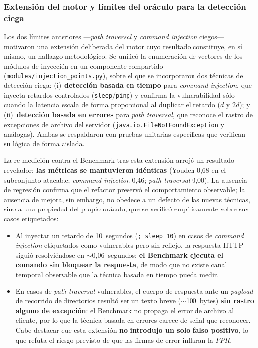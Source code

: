 \documentclass[12pt, a4paper]{article}
\begin{document}
\subsubsection{Extensión del motor y límites del oráculo para la detección ciega}

Los dos límites anteriores ---\textit{path traversal} y \textit{command injection}
ciegos--- motivaron una extensión deliberada del motor cuyo resultado constituye,
en sí mismo, un hallazgo metodológico. Se unificó la enumeración de vectores de los
módulos de inyección en un componente compartido
(\texttt{modules/injection\_points.py}), sobre el que se incorporaron dos técnicas
de detección ciega: (i)~\textbf{detección basada en tiempo} para \textit{command
injection}, que inyecta retardos controlados (\texttt{sleep}/\texttt{ping}) y
confirma la vulnerabilidad sólo cuando la latencia escala de forma proporcional al
duplicar el retardo ($d$ y $2d$); y (ii)~\textbf{detección basada en errores} para
\textit{path traversal}, que reconoce el rastro de excepciones de archivo del
servidor (\texttt{java.io.FileNotFoundException} y análogas). Ambas se respaldaron
con pruebas unitarias específicas que verifican su lógica de forma aislada.

La re-medición contra el Benchmark tras esta extensión arrojó un resultado
revelador: \textbf{las métricas se mantuvieron idénticas} (Youden 0,68 en el
subconjunto atacable; \textit{command injection} 0,46; \textit{path traversal}
0,00). La ausencia de regresión confirma que el refactor preservó el comportamiento
observable; la ausencia de mejora, sin embargo, no obedece a un defecto de las
nuevas técnicas, sino a una propiedad del propio oráculo, que se verificó
empíricamente sobre sus casos etiquetados:

\begin{itemize}
    \item Al inyectar un retardo de 10~segundos (\texttt{; sleep 10}) en casos de
    \textit{command injection} etiquetados como vulnerables pero sin reflejo, la
    respuesta HTTP siguió resolviéndose en $\sim$0,06~segundos: \textbf{el Benchmark
    ejecuta el comando sin bloquear la respuesta}, de modo que no existe canal
    temporal observable que la técnica basada en tiempo pueda medir.

    \item En casos de \textit{path traversal} vulnerables, el cuerpo de respuesta
    ante un \textit{payload} de recorrido de directorios resultó ser un texto breve
    ($\sim$100~bytes) \textbf{sin rastro alguno de excepción}: el Benchmark no
    propaga el error de archivo al cliente, por lo que la técnica basada en errores
    carece de señal que reconocer. Cabe destacar que esta extensión \textbf{no
    introdujo un solo falso positivo}, lo que refuta el riesgo previsto de que las
    firmas de error inflaran la $FPR$.
\end{itemize}
\end{document}
